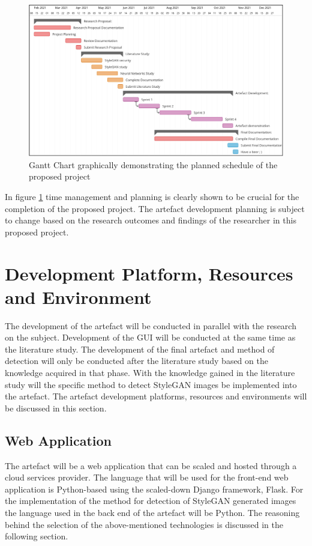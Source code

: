 \begin{figure}[H]%
\centering
\includegraphics[width=1\textwidth]{img/ganttfinal.png}%
\caption{Gantt Chart graphically demonstrating the planned schedule of the proposed project}%
\label{fig:3}%
\end{figure}

In figure \ref{fig:3} time management and planning is clearly shown to be crucial for the completion of the proposed project. The artefact development planning is subject to change based on the research outcomes and findings of the researcher in this proposed project. 

\section{Development Platform, Resources and Environment}

The development of the artefact will be conducted in parallel with the research on the subject. Development of the GUI will be conducted at the same time as the literature study. The development of the final artefact and method of detection will only be conducted after the literature study based on the knowledge acquired in that phase. With the knowledge gained in the literature study will the specific method to detect StyleGAN images be implemented into the artefact. The artefact development platforms, resources and environments will be discussed in this section.

\subsection{Web Application}

The artefact will be a web application that can be scaled and hosted through a cloud services provider. The language that will be used for the front-end web application is Python-based using the scaled-down Django framework, Flask. For the implementation of the method for detection of StyleGAN generated images the language used in the back end of the artefact will be Python. The reasoning behind the selection of the above-mentioned technologies is discussed in the following section.

